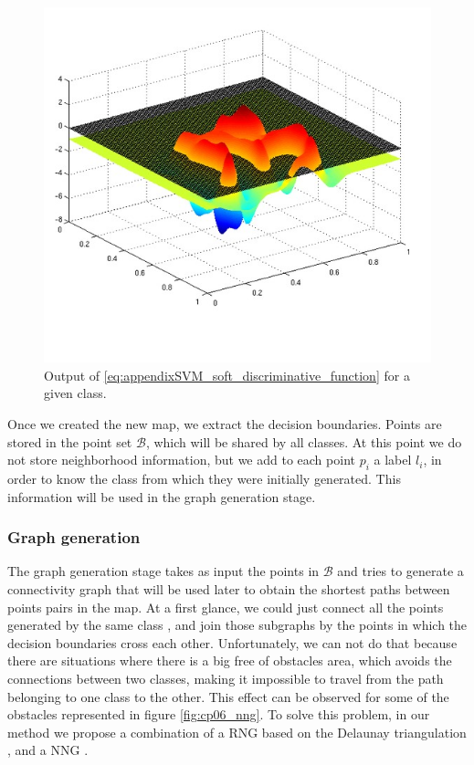 \begin{figure}[h!]
  \centering
  \includegraphics[width=\textwidth, trim=0 0 0 0,clip]{figure2}
  \caption{Output of \ref{eq:appendixSVM_soft_discriminative_function} for a given class.}
  \label{fig:cp06_decision_boundary_3d}
\end{figure}

Once we created the new map, we extract the decision boundaries. Points are stored in the point set $\mathcal{B}$, which will be shared by all classes. At this point we do not store neighborhood information, but we add to each point $p_i$ a label $l_i$, in order to know the class from which they were initially generated. This information will be used in the graph generation stage.

\subsubsection{Graph generation}\label{ch:chapter06_01_01_05}

The graph generation stage takes as input the points in $\mathcal{B}$ and tries to generate a connectivity graph that will be used later to obtain the shortest paths between points pairs in the map. At a first glance, we could just connect all the points generated by the same class , and join those subgraphs by the points in which the decision boundaries cross each other. Unfortunately, we can not do that because there are situations where there is a big free of obstacles area, which avoids the connections between two classes, making it impossible to travel from the path belonging to one class to the other. This effect can be observed for some of the obstacles represented in figure \ref{fig:cp06_nng}.
To solve this problem, in our method we propose a combination of a \acf{RNG} based on the Delaunay triangulation \citep{lingas1994linear}, and a \acf{NNG} \citep{eppstein1997nearest}.

